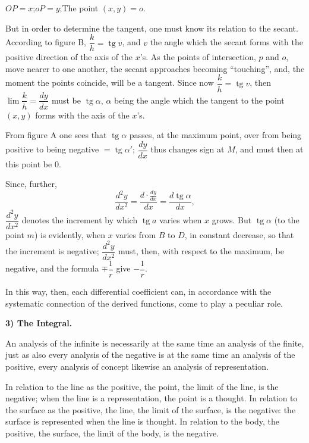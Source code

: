 \documentclass[12pt]{book}
\begin{document}
\begin{center}
$OP = x$;\quad $oP = y$;\quad The point $(x, y) = o$.
\end{center}

But in order to determine the tangent, one must know its relation to the secant.
According to figure B, $\dfrac{k}{h} = \operatorname{tg} v$, and $v$ the angle which
the secant forms with the positive direction of the axis of the $x$'s. As the points
of intersection, $p$ and $o$, move nearer to one another, the secant approaches
becoming ``touching'', and, the
moment the points coincide, will be a tangent. Since now
$\dfrac{k}{h} = \operatorname{tg} v$, then $\lim\dfrac{k}{h} = \dfrac{dy}{dx}$ must be
$\operatorname{tg}\alpha$, $\alpha$ being the angle which the tangent to the point
$(x, y)$ forms with the axis of the $x$'s.

From figure A one sees that $\operatorname{tg}\alpha$ passes, at the maximum point,
over from being positive to being negative $= \operatorname{tg}\alpha'$;
$\dfrac{dy}{dx}$ thus changes sign at $M$, and must then at this point be 0.

Since, further,
\[
\frac{d^{2}y}{dx^{2}} = \frac{d\cdot\frac{dy}{dx}}{dx}
= \frac{d\operatorname{tg}\alpha}{dx},
\]
$\dfrac{d^{2}y}{dx^{2}}$ denotes the increment by which $\operatorname{tg} a$
varies when $x$ grows. But $\operatorname{tg}\alpha$ (to the point $m$) is evidently,
when $x$ varies from $B$ to $D$, in constant decrease, so that the increment is
negative; $\dfrac{d^{2}y}{dx^{2}}$ must, then, with respect to the maximum, be
negative, and the formula $\mp\dfrac{1}{r}$ give $-\dfrac{1}{r}$.

In this way, then, each differential coefficient can, in accordance with the
systematic connection of the derived functions, come to play a peculiar role.

\begin{center}
\textbf{3) The Integral.}
\end{center}
{}

An analysis of the infinite is necessarily at the same time an analysis of the
finite, just as also every analysis of the negative is at the same time an analysis
of the positive, every analysis of concept likewise an analysis of representation.

In relation to the line as the positive, the point, the limit of the line, is the
negative; when the line is a representation, the point is a thought. In relation to
the surface as the positive, the line, the limit of the surface, is the negative: the
surface
is represented when the line is thought. In relation to the body, the positive, the
surface, the limit of the body, is the negative.
\end{document}
